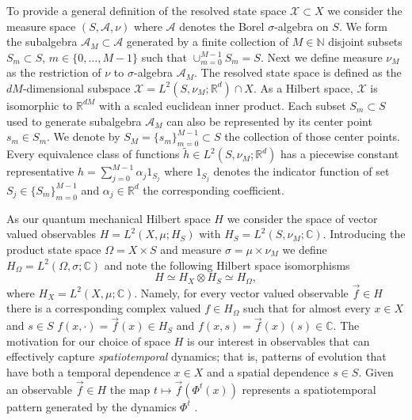 \documentclass[letterpaper,10pt,3p,preprint]{elsarticle}
\newcommand{\Nbb}{\mathbb{N}}
\newcommand{\Rbb}{\mathbb{R}}
\newcommand{\Cbb}{\mathbb{C}}
\newcommand{\Xcal}{\mathcal{X}}
\begin{document}
To provide a general definition of the
resolved state space $\Xcal\subset X$
we consider the measure space $(S,\mathcal{A},\nu)$
where $\mathcal{A}$ denotes the Borel $\sigma$-algebra on $S$.
We form the subalgebra $\mathcal{A}_M\subset\mathcal{A}$
generated by a finite collection of $M\in\Nbb$ disjoint subsets
$S_m\subset S$, $m\in\{0,\ldots,M-1\}$
such that $\cup_{m=0}^{M-1}S_m=S$.
Next we define measure $\nu_M$ as the restriction of $\nu$
to $\sigma$-algebra $\mathcal{A}_M$.
The resolved state space is defined as the $dM$-dimensional
subspace $\Xcal=L^2(S,\nu_M;\Rbb^d)\cap X$.
As a Hilbert space, $\Xcal$ is isomorphic to $\Rbb^{dM}$
with a scaled euclidean inner product.
Each subset $S_m\subset S$ used to generate subalgebra $\mathcal{A}_M$
can also be represented by its center point $s_m\in S_m$.
We denote by $S_M=\{s_m\}_{m=0}^{M-1}\subset S$ the collection of
those center points.
Every equivalence class of functions
$\tilde{h}\in L^2(S,\nu_M;\Rbb^d)$
has a piecewise constant representative
$h=\sum_{j=0}^{M-1}\alpha_j 1_{S_j}$
where $1_{S_j}$ denotes the indicator function of set
$S_j\in\{S_m\}_{m=0}^{M-1}$
and $\alpha_j\in\Rbb^d$ the corresponding coefficient.

As our quantum mechanical Hilbert space $H$ we consider
the space of vector valued observables
$H=L^2(X,\mu;H_S)$ with $H_S=L^2(S,\nu_M;\Cbb)$.
Introducing the product state space $\Omega=X\times S$
and measure $\sigma=\mu\times\nu_M$
we define
$H_\Omega=L^2(\Omega,\sigma;\Cbb)$
and note the following Hilbert space isomorphisms
\begin{equation*}
    H\simeq H_X\otimes H_S\simeq H_\Omega,
\end{equation*}
where $H_X=L^2(X,\mu;\Cbb)$.
Namely, for every vector valued observable $\vec{f}\in H$
there is a corresponding complex valued $f\in H_\Omega$
such that for almost every $x\in X$ and $s\in S$
$f(x,\cdot)=\vec{f}(x)\in H_S$ and
$f(x,s)=\vec{f}(x)(s)\in\Cbb$.
The motivation for our choice of space $H$ is our interest
in observables that can effectively capture
\emph{spatiotemporal} dynamics;
that is, patterns of evolution that have both
a temporal dependence $x\in X$ and
a spatial dependence $s\in S$.
Given an observable $\vec{f}\in H$ the map
$t\mapsto\vec{f}(\Phi^t(x))$
represents a spatiotemporal pattern generated by
the dynamics $\Phi^t$
\cite{Giannakis2019vsa}.
\end{document}
